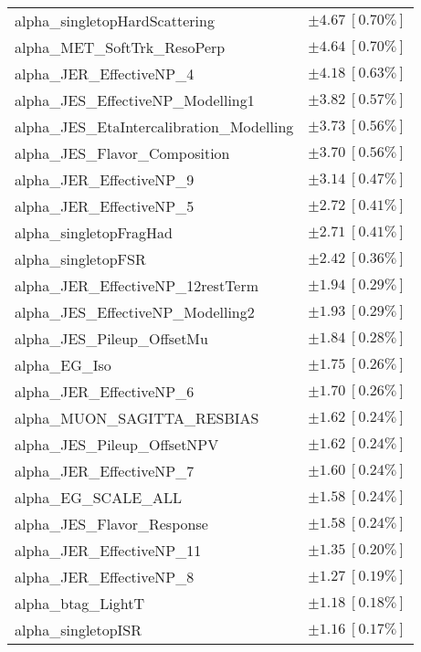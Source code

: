 \begin{table}
\begin{center}
\begin{tabular*}{\textwidth}{@{\extracolsep{\fill}}lc}
alpha\_singletopHardScattering         & $\pm 4.67\ [0.70\%] $       \\
alpha\_MET\_SoftTrk\_ResoPerp         & $\pm 4.64\ [0.70\%] $       \\
alpha\_JER\_EffectiveNP\_4         & $\pm 4.18\ [0.63\%] $       \\
alpha\_JES\_EffectiveNP\_Modelling1         & $\pm 3.82\ [0.57\%] $       \\
alpha\_JES\_EtaIntercalibration\_Modelling         & $\pm 3.73\ [0.56\%] $       \\
alpha\_JES\_Flavor\_Composition         & $\pm 3.70\ [0.56\%] $       \\
alpha\_JER\_EffectiveNP\_9         & $\pm 3.14\ [0.47\%] $       \\
alpha\_JER\_EffectiveNP\_5         & $\pm 2.72\ [0.41\%] $       \\
alpha\_singletopFragHad         & $\pm 2.71\ [0.41\%] $       \\
alpha\_singletopFSR         & $\pm 2.42\ [0.36\%] $       \\
alpha\_JER\_EffectiveNP\_12restTerm         & $\pm 1.94\ [0.29\%] $       \\
alpha\_JES\_EffectiveNP\_Modelling2         & $\pm 1.93\ [0.29\%] $       \\
alpha\_JES\_Pileup\_OffsetMu         & $\pm 1.84\ [0.28\%] $       \\
alpha\_EG\_Iso         & $\pm 1.75\ [0.26\%] $       \\
alpha\_JER\_EffectiveNP\_6         & $\pm 1.70\ [0.26\%] $       \\
alpha\_MUON\_SAGITTA\_RESBIAS         & $\pm 1.62\ [0.24\%] $       \\
alpha\_JES\_Pileup\_OffsetNPV         & $\pm 1.62\ [0.24\%] $       \\
alpha\_JER\_EffectiveNP\_7         & $\pm 1.60\ [0.24\%] $       \\
alpha\_EG\_SCALE\_ALL         & $\pm 1.58\ [0.24\%] $       \\
alpha\_JES\_Flavor\_Response         & $\pm 1.58\ [0.24\%] $       \\
alpha\_JER\_EffectiveNP\_11         & $\pm 1.35\ [0.20\%] $       \\
alpha\_JER\_EffectiveNP\_8         & $\pm 1.27\ [0.19\%] $       \\
alpha\_btag\_LightT         & $\pm 1.18\ [0.18\%] $       \\
alpha\_singletopISR         & $\pm 1.16\ [0.17\%] $       \\

\end{tabular*}
\end{center}
\end{table}
